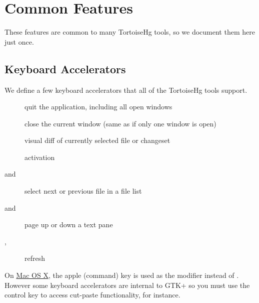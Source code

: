 \documentclass[letterpaper,10pt,english]{manual}
\begin{document}
\resetcurrentobjects
\hypertarget{--doc-common}{}

\section{Common Features}
\hypertarget{module-common.dialog}{}
These features are common to many TortoiseHg tools, so we document them
here just once.


\subsection{Keyboard Accelerators}

We define a few keyboard accelerators that all of the TortoiseHg tools support.
\begin{description}
\item[]
quit the application, including all open windows

\item[]
close the current window (same as  if only one window is open)

\item[]
visual diff of currently selected file or changeset

\item[]
activation

\item[ and ]
select next or previous file in a file list

\item[\code{Ctrl-{[}} and \code{Ctrl-{]}}]
page up or down a text pane

\item[, ]
refresh

\end{description}

On \href{http://bitbucket.org/tortoisehg/stable/wiki/MacOSX}{Mac OS X}, the
apple (command) key is used as the modifier instead of .
However some keyboard accelerators are internal to GTK+ so you must use
the control key to access cut-paste functionality, for instance.
\end{document}
